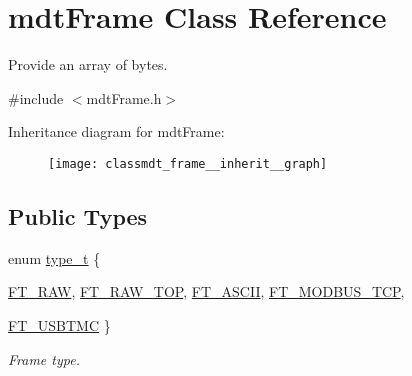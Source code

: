 \hypertarget{classmdt_frame}{
\section{mdtFrame Class Reference}
\label{classmdt_frame}
}


Provide an array of bytes.  




{\ttfamily \#include $<$mdtFrame.h$>$}



Inheritance diagram for mdtFrame:\nopagebreak
\begin{figure}[H]
\begin{center}
\leavevmode
\texttt{[image: classmdt\_frame\_\_inherit\_\_graph]}
\end{center}
\end{figure}
\subsection*{Public Types}
\begin{DoxyCompactItemize}
\item 
enum \hyperlink{classmdt_frame_af936e37d5fe4c066c0fb0161fafd4a17}{type\_\-t} \{ \par
\hyperlink{classmdt_frame_af936e37d5fe4c066c0fb0161fafd4a17aeb10e33f775c33799273fcb130fee86f}{FT\_\-RAW}, 
\hyperlink{classmdt_frame_af936e37d5fe4c066c0fb0161fafd4a17ac91a1c1827fa634eadaddb861f805c96}{FT\_\-RAW\_\-TOP}, 
\hyperlink{classmdt_frame_af936e37d5fe4c066c0fb0161fafd4a17ac649559564652abbe656b97d4a84b722}{FT\_\-ASCII}, 
\hyperlink{classmdt_frame_af936e37d5fe4c066c0fb0161fafd4a17a72c8ddaf29839f4037b686bdc346828a}{FT\_\-MODBUS\_\-TCP}, 
\par
\hyperlink{classmdt_frame_af936e37d5fe4c066c0fb0161fafd4a17aca438ff6b553a819f22090facc562c86}{FT\_\-USBTMC}
 \}
\begin{DoxyCompactList}\small\item\em Frame type. \end{DoxyCompactList}\end{DoxyCompactItemize}
